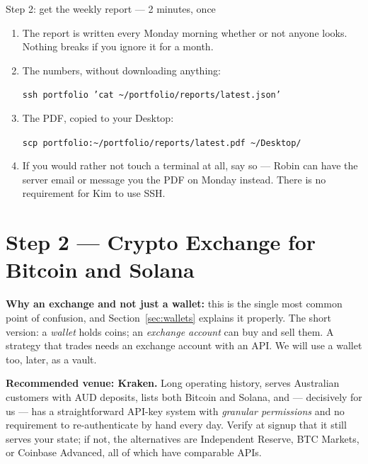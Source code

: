 \documentclass[11pt,a4paper]{article}
\begin{document}
\begin{kimbox}{Step 2: get the weekly report --- 2 minutes, once}
\begin{enumerate}[leftmargin=1.6em, itemsep=3pt]
    \item The report is written every Monday morning whether or not
          anyone looks. Nothing breaks if you ignore it for a month.
    \item The numbers, without downloading anything:

          \vspace{0.3em}
          \texttt{ssh portfolio 'cat \textasciitilde/portfolio/reports/latest.json'}

          \vspace{0.3em}
    \item The PDF, copied to your Desktop:

          \vspace{0.3em}
          \texttt{scp portfolio:\textasciitilde/portfolio/reports/latest.pdf \textasciitilde/Desktop/}

          \vspace{0.3em}
    \item If you would rather not touch a terminal at all, say so ---
          Robin can have the server email or message you the PDF on
          Monday instead. There is no requirement for Kim to use SSH.
\end{enumerate}
\end{kimbox}


\section{Step 2 --- Crypto Exchange for Bitcoin and Solana}
\label{sec:crypto}

\textbf{Why an exchange and not just a wallet:} this is the single most
common point of confusion, and Section~\ref{sec:wallets} explains it
properly. The short version: a \emph{wallet} holds coins; an
\emph{exchange account} can buy and sell them. A strategy that trades
needs an exchange account with an API. We will use a wallet too, later,
as a vault.

\textbf{Recommended venue: Kraken.} Long operating history, serves
Australian customers with AUD deposits, lists both Bitcoin and Solana,
and --- decisively for us --- has a straightforward API-key system with
\emph{granular permissions} and no requirement to re-authenticate by
hand every day. Verify at signup that it still serves your state; if
not, the alternatives are Independent Reserve, BTC Markets, or Coinbase
Advanced, all of which have comparable APIs.
\end{document}
